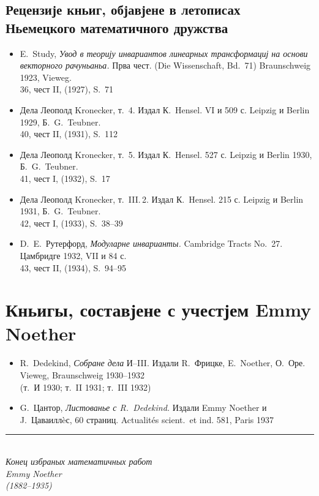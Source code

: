 ﻿\documentclass[11pt]{article}
\newcommand{\foreign}[1]{#1}
\begin{document}
\subsection*{Рецензије кньиг, објавјене в летописах Ньемецкого математичного дружства}

\begin{itemize}[leftmargin=1.5em,itemsep=0.2em]
\item E.\ Study, \textit{Увод в теорију инвариантов линеарных трансформациј на основи векторного рачуньаньа.} Прва чест. (\foreign{Die Wissenschaft}, Bd.~71) Braunschweig 1923, Vieweg.\\
36, чест II, (1927), S.~71

\item Дела Леополд Kronecker, т.~4. Издал К.\ Hensel. VI и 509 с. Leipzig и Berlin 1929, Б.\ G.\ Teubner.\\
40, чест II, (1931), S.~112

\item Дела Леополд Kronecker, т.~5. Издал К.\ Hensel. 527 с. Leipzig и Berlin 1930, Б.\ G.\ Teubner.\\
41, чест I, (1932), S.~17

\item Дела Леополд Kronecker, т.~III.\,2. Издал К.\ Hensel. 215 с. Leipzig и Berlin 1931, Б.\ G.\ Teubner.\\
42, чест I, (1933), S.~38--39

\item D.\ E.\ Рутерфорд, \textit{Модуларне инварианты.} \foreign{Cambridge Tracts No.~27.} Цамбридге 1932, VII и 84 с.\\
43, чест II, (1934), S.~94--95
\end{itemize}

\newpage
\section*{Кньигы, составјене с учестјем Emmy Noether}

\begin{itemize}[leftmargin=1.5em,itemsep=0.5em]
\item R.\ Dedekind, \textit{Собране дела} И--III. Издали R.\ Фрицке, E.\ Noether, О.\ Оре. Vieweg, Braunschweig 1930--1932\\
(т.~И 1930; т.~II 1931; т.~III 1932)

\item G.\ Цантор, \textit{Листованье с R.\ Dedekind.} Издали Emmy Noether и J.\ Цаваиллèс, 60 страниц. \foreign{Actualités scient.\ et ind.} 581, Paris 1937
\end{itemize}

\vfill

\begin{center}
\rule{0.5\textwidth}{0.4pt}\\[1em]
\textit{Конец избраных математичных работ}\\[0.5em]
\textit{Emmy Noether}\\[0.5em]
\textit{(1882--1935)}
\end{center}
\end{document}
